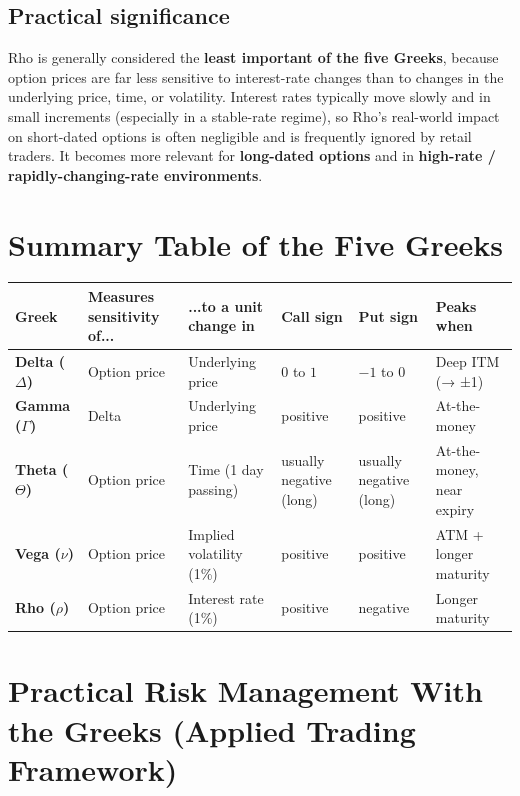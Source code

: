 \documentclass[12pt,openany]{book}
\theoremstyle{definition}
\theoremstyle{remark}
\begin{document}
\subsection{Practical significance}

Rho is generally considered the \textbf{least important of the five Greeks}, because option prices are far less sensitive to interest-rate changes than to changes in the underlying price, time, or volatility. Interest rates typically move slowly and in small increments (especially in a stable-rate regime), so Rho's real-world impact on short-dated options is often negligible and is frequently ignored by retail traders. It becomes more relevant for \textbf{long-dated options} and in \textbf{high-rate / rapidly-changing-rate environments}.


\section{Summary Table of the Five Greeks}

{\small
\setlength{\tabcolsep}{3pt}
\begin{longtable}{@{}L{0.10\textwidth}L{0.20\textwidth}L{0.16\textwidth}L{0.16\textwidth}L{0.16\textwidth}L{0.15\textwidth}@{}}
\toprule
\textbf{Greek} & \textbf{Measures sensitivity of...} & \textbf{...to a unit change in} & \textbf{Call sign} & \textbf{Put sign} & \textbf{Peaks when} \\
\midrule
\textbf{Delta (\ensuremath{\Delta})} & Option price & Underlying price & \(0\) to \(1\) & \(-1\) to \(0\) & Deep ITM (→ ±1) \\
\textbf{Gamma (\ensuremath{\Gamma})} & Delta & Underlying price & positive & positive & At-the-money \\
\textbf{Theta (\ensuremath{\Theta})} & Option price & Time (1 day passing) & usually negative (long) & usually negative (long) & At-the-money, near expiry \\
\textbf{Vega (\ensuremath{\nu})} & Option price & Implied volatility (1\%) & positive & positive & ATM + longer maturity \\
\textbf{Rho (\ensuremath{\rho})} & Option price & Interest rate (1\%) & positive & negative & Longer maturity \\
\bottomrule
\end{longtable}
}


\section{Practical Risk Management With the Greeks (Applied Trading Framework)}
\end{document}
